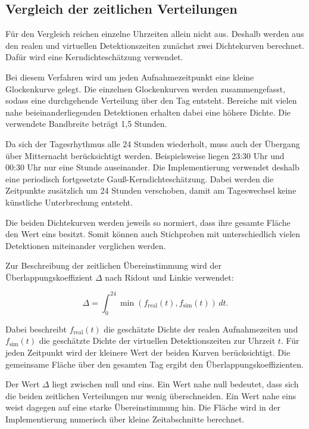 \documentclass[12pt,a4paper]{report}
\begin{document}
\subsection{Vergleich der zeitlichen Verteilungen}
\label{subsec:aktivitaetsvergleich}

Für den Vergleich reichen einzelne Uhrzeiten
allein nicht aus. Deshalb werden aus den realen
und virtuellen Detektionszeiten zunächst zwei
Dichtekurven berechnet. Dafür wird eine
Kerndichteschätzung verwendet.

Bei diesem Verfahren wird um jeden Aufnahmezeitpunkt
eine kleine Glockenkurve gelegt. Die einzelnen
Glockenkurven werden zusammengefasst, sodass
eine durchgehende Verteilung über den Tag entsteht.
Bereiche mit vielen nahe beieinanderliegenden
Detektionen erhalten dabei eine höhere Dichte.
Die verwendete Bandbreite beträgt 1,5 Stunden.

Da sich der Tagesrhythmus alle 24 Stunden wiederholt,
muss auch der Übergang über Mitternacht berücksichtigt
werden. Beispielsweise liegen 23:30 Uhr und
00:30 Uhr nur eine Stunde auseinander. Die
Implementierung verwendet deshalb eine periodisch
fortgesetzte Gauß-Kerndichteschätzung. Dabei
werden die Zeitpunkte zusätzlich um 24 Stunden
verschoben, damit am Tageswechsel keine
künstliche Unterbrechung entsteht.

Die beiden Dichtekurven werden jeweils so
normiert, dass ihre gesamte Fläche den Wert
eins besitzt. Somit können auch Stichproben
mit unterschiedlich vielen Detektionen
miteinander verglichen werden.

Zur Beschreibung der zeitlichen Übereinstimmung
wird der Überlappungskoeffizient $\Delta$
nach Ridout und Linkie
\cite{RidoutLinkie2009} verwendet:

\begin{equation}
    \Delta =
    \int_{0}^{24}
    \min\left(
        f_{\mathrm{real}}(t),
        f_{\mathrm{sim}}(t)
    \right)\,dt.
    \label{eq:aktivitaetsueberlappung}
\end{equation}

Dabei beschreibt $f_{\mathrm{real}}(t)$ die
geschätzte Dichte der realen Aufnahmezeiten
und $f_{\mathrm{sim}}(t)$ die geschätzte Dichte
der virtuellen Detektionszeiten zur Uhrzeit $t$.
Für jeden Zeitpunkt wird der kleinere Wert
der beiden Kurven berücksichtigt. Die
gemeinsame Fläche über den gesamten Tag
ergibt den Überlappungskoeffizienten.

Der Wert $\Delta$ liegt zwischen null und eins.
Ein Wert nahe null bedeutet, dass sich die beiden
zeitlichen Verteilungen nur wenig überschneiden.
Ein Wert nahe eins weist dagegen auf eine starke
Übereinstimmung hin. Die Fläche wird in der
Implementierung numerisch über kleine
Zeitabschnitte berechnet.
\end{document}
